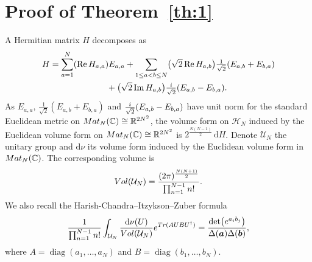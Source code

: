 \documentclass[11pt]{article}
\numberwithin{equation}{section}
\numberwithin{equation}{section}
\newcommand{\dd}{\mathrm{d}}
\begin{document}
\setcounter{section}{1}
\section{Proof of Theorem~\ref{th:1}}
\label{S2}
A Hermitian matrix $H$ decomposes as
\begin{gather*}
H = \sum_{a = 1}^N (\operatorname{Re} H_{a,a}) E_{a,a}+ \sum_{1 \leq a < b \leq N} \bigl(\sqrt{2} \operatorname{Re} H_{a,b}\bigr) \tfrac{1}{\sqrt{2}}(E_{a,b} + E_{b,a}) \\
\hphantom{H =}{}
 + \bigl(\sqrt{2} \operatorname{Im} H_{a,b}\bigr) \tfrac{{\rm i}}{\sqrt{2}}(E_{a,b} - E_{b,a}).
\end{gather*}
As $E_{a,a}$, $\frac{1}{\sqrt{2}}(E_{a,b} + E_{b,a})$ and $\frac{{\rm i}}{\sqrt{2}}(E_{a,b} - {\rm E}_{b,a})$ have unit norm for the standard Euclidean metric on ${\rm Mat}_{N}(\mathbb{C}) \cong \mathbb{R}^{2N^2}$, the volume form on $\mathcal{H}_N$ induced by the Euclidean volume form on ${\rm Mat}_N(\mathbb{C}) \cong \mathbb{R}^{2N^2}$ is $2^{\frac{N(N - 1)}{2}}\,\dd H$. Denote $\mathcal{U}_N$ the unitary group and $\dd\nu$ its volume form induced by the Euclidean volume form in ${\rm Mat}_N(\mathbb{C})$. The corresponding volume is
 \[
 {\rm Vol}(\mathcal{U}_N) = \frac{(2\pi)^{\frac{N(N + 1)}{2}}}{\prod_{n = 1}^{N - 1} n!}.
\]
We also recall the Harish-Chandra--Itzykson--Zuber formula \cite{Itzykson:1979fi}
\[
\frac{1}{\prod_{n = 1}^{N - 1} n!} \int_{\mathcal{U}_N} \frac{\dd \nu(U)}{{\rm Vol}(\mathcal{U}_N)} {\rm e}^{{\rm Tr}(AUBU^{\dagger})} = \frac{\det\bigl({\rm e}^{a_ib_j}\bigr)}{\Delta(\boldsymbol{a})\Delta(\boldsymbol{b})},
\]
 where $A = \operatorname{diag}(a_1,\dots,a_N)$ and $B = \operatorname{diag}(b_1,\dots,b_N)$.
\end{document}
